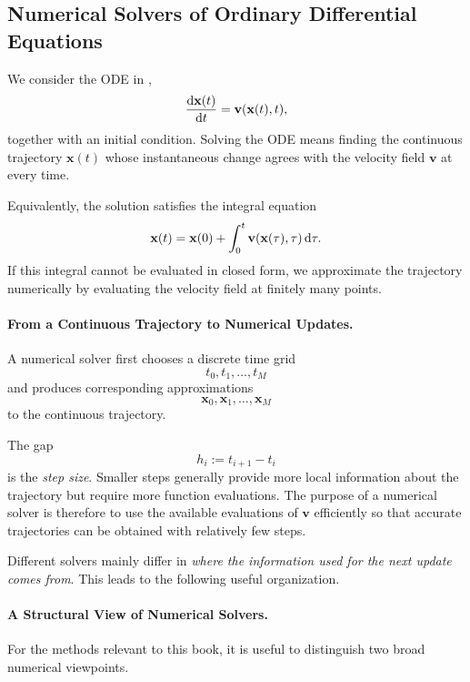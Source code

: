 \subsection{Numerical Solvers of Ordinary Differential Equations}
\label{app:de-solver}

We consider the ODE in ,
\[
\frac{\mathop{}\!\mathrm{d}\mathbf{x}(t)}{\mathop{}\!\mathrm{d} t}
=
\mathbf{v}(\mathbf{x}(t),t),
\]
together with an initial condition. Solving the ODE means finding the
continuous trajectory $\mathbf{x}(t)$ whose instantaneous change agrees with
the velocity field $\mathbf{v}$ at every time.

Equivalently, the solution satisfies the integral equation
\begin{equation}
\label{eq:integral_form}
\mathbf{x}(t)
=
\mathbf{x}(0)
+
\int_0^t
\mathbf{v}(\mathbf{x}(\tau),\tau)\mathop{}\!\mathrm{d}\tau.
\end{equation}
If this integral cannot be evaluated in closed form, we approximate the
trajectory numerically by evaluating the velocity field at finitely many
points.

\paragraph{From a Continuous Trajectory to Numerical Updates.}
A numerical solver first chooses a discrete time grid
\[
t_0,t_1,\ldots,t_M
\]
and produces corresponding approximations
\[
\mathbf{x}_0,\mathbf{x}_1,\ldots,\mathbf{x}_M
\]
to the continuous trajectory.

The gap
\[
h_i:=t_{i+1}-t_i
\]
is the \emph{step size}. Smaller steps generally provide more local
information about the trajectory but require more function evaluations.
The purpose of a numerical solver is therefore to use the available
evaluations of $\mathbf{v}$ efficiently so that accurate trajectories can be
obtained with relatively few steps.

Different solvers mainly differ in \emph{where the information used for the
next update comes from}. This leads to the following useful organization.

\paragraph{A Structural View of Numerical Solvers.}
For the methods relevant to this book, it is useful to distinguish two broad
numerical viewpoints.

